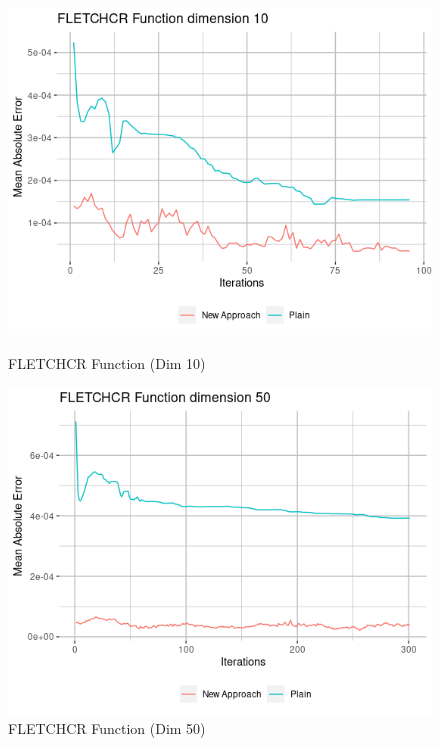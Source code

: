 \documentclass{article}
\begin{document}
\begin{figure}[H] 
	\label{ fig7} 
	\begin{minipage}[b]{0.5\linewidth}
		\centering
		\includegraphics[scale=0.5]{plots/FLETCHCR_dim10.png} 
		\caption{FLETCHCR Function (Dim 10)} 
		\vspace{4ex}
	\end{minipage}%
	\begin{minipage}[b]{0.5\linewidth}
		\centering
		\includegraphics[scale=0.5]{plots/FLETCHCR_dim50.png} 
		\caption{FLETCHCR Function (Dim 50)} 
		\vspace{4ex}
	\end{minipage} 
	\begin{minipage}[b]{0.5\linewidth}

\end{minipage}
\end{figure}
\end{document}
